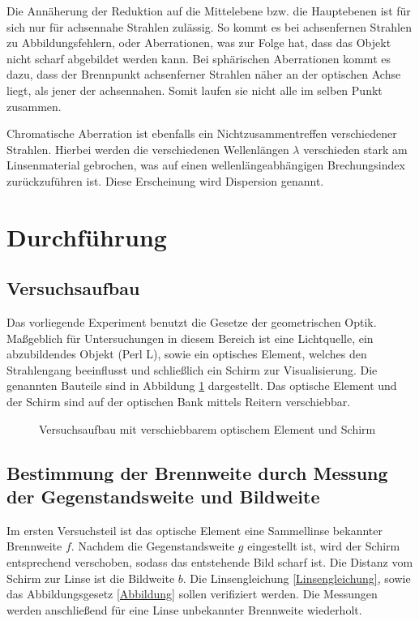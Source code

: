 Die Annäherung der Reduktion auf die Mittelebene bzw. die Hauptebenen ist für sich nur für achsennahe Strahlen zulässig. So kommt
es bei achsenfernen Strahlen zu Abbildungsfehlern, oder Aberrationen, was zur Folge hat, dass das Objekt nicht scharf abgebildet
werden kann. Bei sphärischen Aberrationen kommt es dazu, dass der Brennpunkt achsenferner Strahlen näher an der optischen Achse liegt,
als jener der achsennahen. Somit laufen sie nicht alle im selben Punkt zusammen. 

Chromatische Aberration ist ebenfalls ein Nichtzusammentreffen verschiedener Strahlen. Hierbei werden die verschiedenen Wellenlängen
$\lambda$ verschieden stark am Linsenmaterial gebrochen, 
was auf einen wellenlängeabhängigen Brechungsindex \linebreak zurückzuführen ist. Diese
Erscheinung wird Dispersion genannt.

\section{Durchführung}
\subsection{Versuchsaufbau}
Das vorliegende Experiment benutzt die Gesetze der geometrischen Optik. Maßgeblich für Untersuchungen in diesem Bereich ist eine Lichtquelle,
ein abzubildendes Objekt (Perl L), sowie ein optisches Element, welches den Strahlengang beeinflusst und schließlich ein Schirm zur
Visualisierung. Die genannten Bauteile sind in Abbildung \ref{aufbau} dargestellt. Das optische Element und der Schirm sind auf der optischen
Bank mittels Reitern verschiebbar.

\begin{figure}[H]

\caption{Versuchsaufbau mit verschiebbarem optischem Element und Schirm}
\label{aufbau}
\end{figure}

\subsection[Messung von Gegenstandsweite und Bildweite]{Bestimmung der Brennweite durch Messung der Gegenstandsweite und Bildweite}
Im ersten Versuchsteil ist das optische Element eine Sammellinse bekannter Brennweite $f$. Nachdem die Gegenstandsweite $g$ eingestellt ist,
wird der Schirm entsprechend verschoben, sodass das entstehende Bild scharf ist. Die Distanz vom Schirm zur Linse ist die Bildweite $b$.
Die Linsengleichung \eqref{Linsengleichung}, sowie das Abbildungsgesetz \eqref{Abbildung} sollen verifiziert werden. Die Messungen werden anschließend für eine Linse unbekannter Brennweite
wiederholt.

